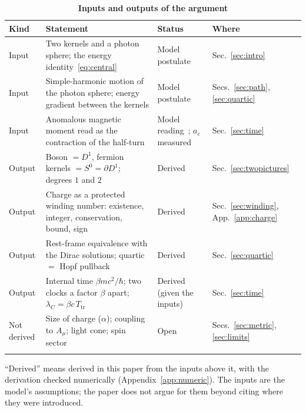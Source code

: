 \documentclass[%
 reprint, amsmath,amssymb, aps, prb, ]{revtex4-2}
\numberwithin{equation}{section}
\begin{document}
\begin{table}[t!]
\centering
\caption{\textbf{Inputs and outputs of the argument}}
\label{tab:io}
\renewcommand{\arraystretch}{1.4}
\begin{tabular}{p{1.8cm}p{8.4cm}p{2.6cm}p{2.8cm}}
\toprule
\textbf{Kind} & \textbf{Statement} & \textbf{Status} & \textbf{Where} \\
\midrule
Input
& Two kernels and a photon sphere; the energy identity~\eqref{eq:central}
& Model postulate~\cite{ref:p1}
& Sec.~\ref{sec:intro} \\
\addlinespace[0.3cm]
Input
& Simple-harmonic motion of the photon sphere; energy gradient between the kernels
& Model postulate~\cite{ref:p1,ref:p10}
& Secs.~\ref{sec:path}, \ref{sec:quartic} \\
\addlinespace[0.3cm]
Input
& Anomalous magnetic moment read as the contraction of the half-turn
& Model reading~\cite{ref:p10}; $a_e$ measured
& Sec.~\ref{sec:time} \\
\addlinespace[0.3cm]
Output
& Boson $=D^1$, fermion kernels $=S^0=\partial D^1$; degrees $1$ and $2$
& Derived
& Sec.~\ref{sec:twopictures} \\
\addlinespace[0.3cm]
Output
& Charge as a protected winding number: existence, integer, conservation, bound, sign
& Derived
& Sec.~\ref{sec:winding}, App.~\ref{app:charge} \\
\addlinespace[0.3cm]
Output
& Rest-frame equivalence with the Dirac solutions; quartic $=$ Hopf pullback
& Derived
& Sec.~\ref{sec:quartic} \\
\addlinespace[0.3cm]
Output
& Internal time $\beta mc^2/\hbar$; two clocks a factor $\beta$ apart; $\lambda_C=\beta c\,T_{\mathrm{tr}}$
& Derived (given the inputs)
& Sec.~\ref{sec:time} \\
\addlinespace[0.3cm]
Not derived
& Size of charge ($\alpha$); coupling to $A_\mu$; light cone; spin sector
& Open
& Secs.~\ref{sec:metric}, \ref{sec:limits} \\
\addlinespace[0.2cm]
\bottomrule
\end{tabular}
\vspace{0.2cm}
\begin{minipage}{0.95\textwidth}
\justifying\footnotesize
``Derived'' means derived in this paper from the inputs above it, with the derivation checked numerically (Appendix~\ref{app:numeric}). The inputs are the model's assumptions; the paper does not argue for them beyond citing where they were introduced.
\end{minipage}
\end{table}
\end{document}
